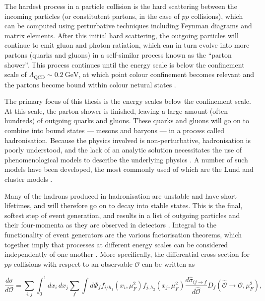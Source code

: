 \documentclass[12pt,a4paper]{report}
\begin{document}
The hardest process in a particle collision is the hard scattering between the incoming particles (or constitutent partons, in the case of $pp$ collisions), which can be computed using perturbative techniques including Feynman diagrams and matrix elements. After this initial hard scattering, the outgoing particles will continue to emit gluon and photon ratiation, which can in turn evolve into more partons (quarks and gluons) in a self-similar process known as the ``parton shower''. This process continues until the energy scale is below the confinement scale of $\Lambda_\text{QCD} \sim \qty{0.2}{\giga\electronvolt}$, at which point colour confinement becomes relevant and the partons become bound within colour netural states \cite{Bierlich:2022pfr,Buckley:2011ms}.

The primary focus of this thesis is the energy scales below the confinement scale. At this scale, the parton shower is finished, leaving a large amount (often hundreds) of outgoing quarks and gluons. These quarks and gluons will go on to combine into bound states --- mesons and baryons --- in a process called hadronisation. Because the physics involved is non-perturbative, hadronisation is poorly understood, and the lack of an analytic solution necessitates the use of phenomenological models to describe the underlying physics \cite{Bierlich:2022pfr,Skands:2012ts}. A number of such models have been developed, the most commonly used of which are the Lund \cite{Andersson:1983ia,Andersson:1997xwk} and cluster models \cite{navas_review_2024,Buckley:2011ms}.

Many of the hadrons produced in hadronisation are unstable and have short lifetimes, and will therefore go on to decay into stable states. This is the final, softest step of event generation, and results in a list of outgoing particles and their four-momenta as they are observed in detectors \cite{Bierlich:2022pfr,Buckley:2011ms}. Integral to the functionality of event generators are the various factorisation theorems, which together imply that processes at different energy scales can be considered independently of one another \cite{Collins:1981uw, Skands:2012ts}. More specifically, the differential cross section for $pp$ collisions with respect to an observable $\mathcal{O}$ can be written as

\begin{equation}
  \frac{d\sigma}{d\mathcal{O}} = \sum_{i,j} \int_0^1 dx_i \, dx_j \sum_f \int d\Phi_f f_{i/h_1}(x_i,\mu_F^2)f_{j,h_2}(x_j,\mu_F^2) \frac{d \hat{\sigma}_{ij\rightarrow f}}{d\hat{\mathcal{O}}} D_f (\hat{\mathcal{O}} \rightarrow \mathcal{O},\mu_F^2),
\end{equation}
\end{document}
